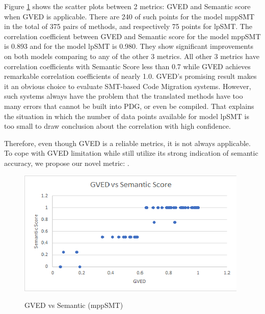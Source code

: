 Figure \ref{fig:GVEDmppSMT} shows the scatter plots between 2 metrics: GVED and Semantic score when GVED is applicable. There are 240 of such points for the model mppSMT in the total of 375 pairs of methods, and respectively 75 points for lpSMT. The correlation coefficient between GVED and Semantic score for the model mppSMT is 0.893 and for the model lpSMT is 0.980. They show significant improvements on both models comparing to any of the other 3 metrics. All other 3 metrics have correlation coefficients with Semantic Score less than 0.7 while GVED achieves remarkable correlation coefficients of nearly 1.0. GVED's promising result makes it an obvious choice to evaluate SMT-based Code Migration systems. However, such systems always have the problem that the translated methods have too many errors that cannot be built into PDG, or even be compiled. That explains the situation
in which the number of data points available for model lpSMT is too small to draw conclusion about the correlation with high confidence. 

Therefore, even though GVED is a reliable metrics, it is not always applicable. To cope with GVED limitation while still utilize its strong indication of semantic accuracy, we propose our novel metric: {\model}. 

%
\begin{figure}
\caption{GVED vs Semantic (mppSMT)}
\centering
\includegraphics{img/gved_mppSMT.png}
\label{fig:GVEDmppSMT}
\end{figure}